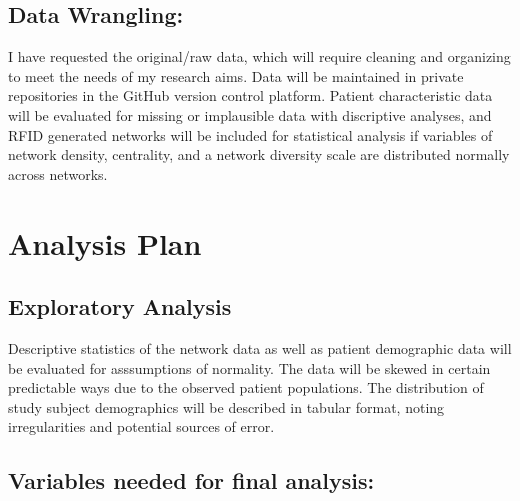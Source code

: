 \documentclass[]{elsarticle} %
\begin{document}
\subsection{Data Wrangling:}\label{data-wrangling}

I have requested the original/raw data, which will require cleaning and
organizing to meet the needs of my research aims. Data will be
maintained in private repositories in the GitHub version control
platform. Patient characteristic data will be evaluated for missing or
implausible data with discriptive analyses, and RFID generated networks
will be included for statistical analysis if variables of network
density, centrality, and a network diversity scale are distributed
normally across networks.

\section{Analysis Plan}\label{analysis-plan}

\subsection{Exploratory Analysis}\label{exploratory-analysis}

Descriptive statistics of the network data as well as patient
demographic data will be evaluated for asssumptions of normality. The
data will be skewed in certain predictable ways due to the observed
patient populations. The distribution of study subject demographics will
be described in tabular format, noting irregularities and potential
sources of error.

\subsection{Variables needed for final
analysis:}\label{variables-needed-for-final-analysis}
\end{document}
